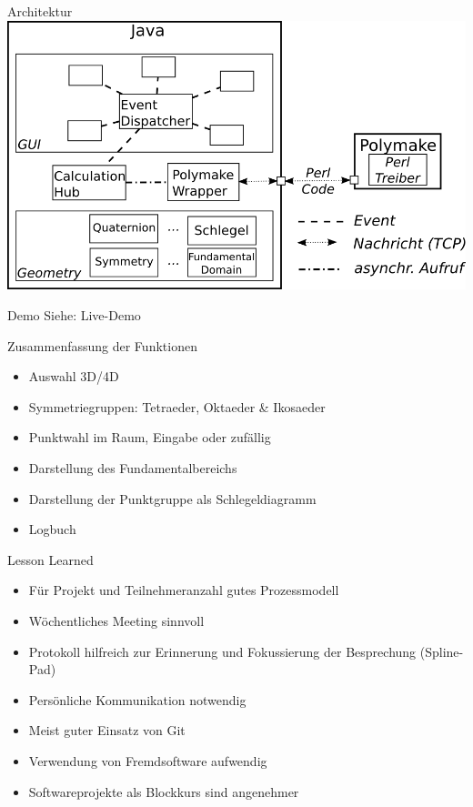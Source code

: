 \documentclass[ucs,11pt]{beamer}
\begin{document}
\begin{frame}{Architektur}
\includegraphics[width=1\textwidth]{architecture.png}
\end{frame}

\begin{frame}{Demo}
\huge{Siehe: Live-Demo}
\end{frame}

\begin{frame}{Zusammenfassung der Funktionen}
	\begin{itemize}
		\item Auswahl 3D/4D \pause
		\item Symmetriegruppen: Tetraeder, Oktaeder \& Ikosaeder \pause
		\item Punktwahl im Raum, Eingabe oder zufällig \pause
		\item Darstellung des Fundamentalbereichs \pause
		\item Darstellung der Punktgruppe als Schlegeldiagramm \pause
		\item Logbuch 	
	\end{itemize}
\end{frame}

\begin{frame}{Lesson Learned}
	\begin{itemize}
		\item Für Projekt und Teilnehmeranzahl gutes Prozessmodell \pause
		\item Wöchentliches Meeting sinnvoll \pause
		\item Protokoll hilfreich zur Erinnerung und Fokussierung der Besprechung (Spline-Pad) \pause
		\item Persönliche Kommunikation notwendig \pause
		\item Meist guter Einsatz von Git \pause
		\item Verwendung von Fremdsoftware aufwendig \pause
		\item Softwareprojekte als Blockkurs sind angenehmer \pause
	\end{itemize}
\end{frame}
\end{document}

